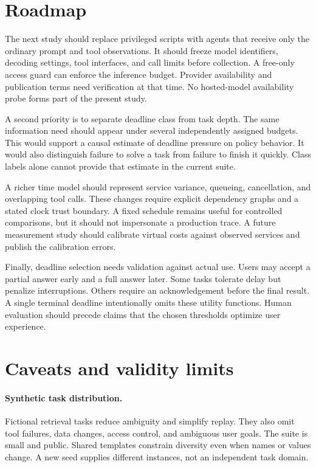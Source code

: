 \documentclass{article}
\begin{document}
\section{Roadmap}
The next study should replace privileged scripts with agents that receive only the ordinary prompt and tool observations. It should freeze model identifiers, decoding settings, tool interfaces, and call limits before collection. A free-only access guard can enforce the inference budget. Provider availability and publication terms need verification at that time. No hosted-model availability probe forms part of the present study.\par
A second priority is to separate deadline class from task depth. The same information need should appear under several independently assigned budgets. This would support a causal estimate of deadline pressure on policy behavior. It would also distinguish failure to solve a task from failure to finish it quickly. Class labels alone cannot provide that estimate in the current suite.\par
A richer time model should represent service variance, queueing, cancellation, and overlapping tool calls. These changes require explicit dependency graphs and a stated clock trust boundary. A fixed schedule remains useful for controlled comparisons, but it should not impersonate a production trace. A future measurement study should calibrate virtual costs against observed services and publish the calibration errors.\par
Finally, deadline selection needs validation against actual use. Users may accept a partial answer early and a full answer later. Some tasks tolerate delay but penalize interruptions. Others require an acknowledgement before the final result. A single terminal deadline intentionally omits these utility functions. Human evaluation should precede claims that the chosen thresholds optimize user experience.\par
\section{Caveats and validity limits}
\paragraph{Synthetic task distribution.} Fictional retrieval tasks reduce ambiguity and simplify replay. They also omit tool failures, data changes, access control, and ambiguous user goals. The suite is small and public. Shared templates constrain diversity even when names or values change. A new seed supplies different instances, not an independent task domain.\par
\end{document}
